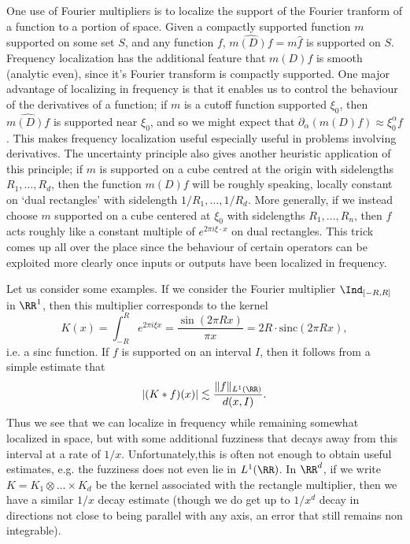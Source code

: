 One use of Fourier multipliers is to localize the support of the Fourier tranform of a function to a portion of space. Given a compactly supported function $m$ supported on some set $S$, and any function $f$, $\widehat{m(D) f} = m \widehat{f}$ is supported on $S$. Frequency localization has the additional feature that $m(D) f$ is smooth (analytic even), since it's Fourier transform is compactly supported. One major advantage of localizing in frequency is that it enables us to control the behaviour of the derivatives of a function; if $m$ is a cutoff function supported $\xi_0$, then $\widehat{m(D) f}$ is supported near $\xi_0$, and so we might expect that $\partial_\alpha (m(D) f) \approx \xi_0^\alpha f$. This makes frequency localization useful especially useful in problems involving derivatives. The uncertainty principle also gives another heuristic application of this principle; if $m$ is supported on a cube centred at the origin with sidelengths $R_1,\dots,R_d$, then the function $m(D) f$ will be roughly speaking, locally constant on `dual rectangles' with sidelength $1/R_1, \dots, 1/R_d$. More generally, if we instead choose $m$ supported on a cube centered at $\xi_0$ with sidelengths $R_1,\dots,R_n$, then $f$ acts roughly like a constant multiple of $e^{2 \pi i \xi \cdot x}$ on dual rectangles. This trick comes up all over the place since the behaviour of certain operators can be exploited more clearly once inputs or outputs have been localized in frequency.

Let us consider some examples. If we consider the Fourier multiplier $\Ind_{[-R,R]}$ in $\RR^1$, then this multiplier corresponds to the kernel
%
\[ K(x) = \int_{-R}^R e^{2 \pi i \xi x} = \frac{\sin(2 \pi R x)}{\pi x} = 2R \cdot \text{sinc}(2 \pi R x), \]
%
i.e. a sinc function. If $f$ is supported on an interval $I$, then it follows from a simple estimate that
%
\[ |(K * f)(x)| \lesssim \frac{\| f \|_{L^1(\RR)}}{d(x,I)}. \]
%
Thus we see that we can localize in frequency while remaining somewhat localized in space, but with some additional fuzziness that decays away from this interval at a rate of $1/x$. Unfortunately,this is often not enough to obtain useful estimates, e.g. the fuzziness does not even lie in $L^1(\RR)$. In $\RR^d$, if we write $K = K_1 \otimes \dots \times K_d$ be the kernel associated with the rectangle multiplier, then we have a similar $1/x$ decay estimate (though we do get up to $1/x^d$ decay in directions not close to being parallel with any axis, an error that still remains non integrable).

